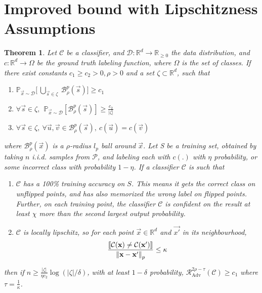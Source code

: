 \documentclass{ociamthesis}
\newtheorem{theorem}{Theorem}
\begin{document}
\section{Improved bound with Lipschitzness Assumptions}
\begin{theorem}
    \label{theorem:lipschitzness-extension}
    Let $\mathcal{C}$ be a classifier, and $\mathcal{D}: \mathbb{R}^d \to
    \mathbb{R}_{\geq 0}$ the data distribution, and $c: \mathbb{R}^d \to \Omega$
    be the ground truth labeling function, where $\Omega$ is the set of classes.
    If there exist constants $c_1 \geq c_2 > 0, \rho > 0$ and a set $\zeta
    \subset \mathbb{R}^d$, such that
    \begin{enumerate}
        \item $\mathbb{P}_{\vec{x} \sim \mathcal{D}} \bigg [~\underset{\vec{s}
        \in \zeta}{\bigcup}~\mathcal{B}_\rho^p(\vec{s}) \bigg ] \geq c_1$
        \item $\forall \vec{s} \in \zeta,~~ \mathbb{P}_{\vec{x} \sim
        \mathcal{D}} [\mathcal{B}_\rho^p(\vec{s})] \geq \frac{c_2}{|\zeta|}$
        \item $\forall \vec{s} \in \zeta,~\forall \vec{u}, \vec{v} \in
        \mathcal{B}_\rho^p(\vec{s}),~c(\vec{u}) = c(\vec{v})$
    \end{enumerate}
    where $\mathcal{B}^p_\rho(\vec{x})$ is a $\rho$-radius $l_p$ ball around
    $\vec{x}$. Let S be a training set, obtained by taking $n$ i.i.d. samples
    from $\mathcal{P}$, and labeling each with $c(.)$ with $\eta$ probability,
    or some incorrect class with probability $1-\eta$. If a classifier
    $\mathcal{C}$ is such that 
    \begin{enumerate}
        \item $\mathcal{C}$ has a 100\% training accuracy on $S$. This means it
        gets the correct class on unflipped points, and has also memorized the
        wrong label on flipped points. Further, on each training point, the
        classifier $\mathcal{C}$ is confident on the result at least $\chi$ more
        than the second largest output probability.
        \item $\mathcal{C}$ is locally lipschitz, so for each point $\vec{x} \in
        \mathbb{R}^d$ and $\vec{x'}$ in its neighbourhood,
            \begin{equation*}
                \frac{\llbracket \mathcal{C}({\mathbf{x}}) \neq \mathcal{C}({\mathbf{x'}}) \rrbracket}
                    {\mathrm{\left\lVert{\mathbf{x}} - {\mathbf{x'}}\right\rVert}_p} 
                \leq \kappa
            \end{equation*}
    \end{enumerate}
    then if $n \geq \frac{|\zeta|}{\eta c_2} \log (|\zeta|/\delta)$, with at
    least $1-\delta$ probability,
    $\mathcal{R}_{\text{Adv}}^{2\rho-\tau}(\mathcal{C}) \geq c_1$ where $\tau =
    \frac{1}{\kappa}$.
\end{theorem}
\end{document}
